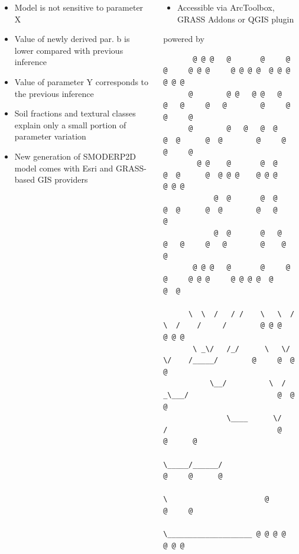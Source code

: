 \begin{columns}
    \begin{column}{0.5\textwidth}
        \justifying
        {\rmfamily
        \begin{itemize}
            \item Model is not sensitive to parameter X
            \item Value of newly derived par. b is lower compared with previous inference
            \item Value of parameter Y corresponds to the previous inference
            \item Soil fractions and textural classes explain only a small portion of parameter variation
            \item New generation of SMODERP2D model comes with Esri and GRASS-based GIS providers
        \end{itemize}

        }
    \end{column}
    \begin{column}{0.5\textwidth}
        \justifying
        {\rmfamily
        \begin{itemize}
            \item Accessible via ArcToolbox, GRASS Addons or QGIS plugin
        \end{itemize}
        }
    powered by
    {\tiny
    \begin{lstlisting}
       @ @ @   @       @     @ @     @ @ @     @ @ @ @  @ @ @    @ @ @
      @        @ @   @ @   @     @   @     @   @        @     @  @     @
      @        @   @   @  @       @  @      @  @        @     @  @     @
        @ @    @       @  @       @  @      @  @ @ @    @ @ @    @ @ @
            @  @       @  @       @  @      @  @        @   @    @
            @  @       @   @     @   @     @   @        @    @   @
       @ @ @   @       @     @ @     @ @ @     @ @ @ @  @     @  @

      \  \  /   / /    \   \  /   \  /    /     /        @ @ @   @ @ @
       \ _\/   /_/      \   \/     \/    /_____/        @     @  @     @
           \__/          \  /      _\___/                     @  @      @
               \____      \/      /                          @   @      @
                    \_____/______/                         @     @      @
                                 \                       @       @     @
                                  \____________________ @ @ @ @  @ @ @
    \end{lstlisting}
    }

    \end{column}
\end{columns}


